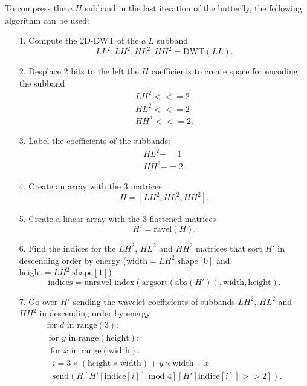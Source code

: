 To compress the $a.H$ subband in the last iteration of the butterfly,
the following algorithm can be used:
\begin{enumerate}
\item [1.] Compute the 2D-DWT of the $a.L$ subband
\begin{equation}
  LL^2, LH^2, HL^2, HH^2 = \text{DWT}(LL). 
\end{equation}

\item [2.] Desplace 2 bits to the left the $H$ coefficients to create
  space for encoding the subband
  \begin{equation}
    \begin{array}{l}
      LH^2 <<= 2 \\
      HL^2 <<= 2 \\
      HH^2 <<= 2.
    \end{array}
  \end{equation}
\item [3.] Label the coefficients of the subbands:
  \begin{equation}
    \begin{array}{l}
      HL^2 += 1 \\
      HH^2 += 2.
    \end{array}
  \end{equation}
\item [4.] Create an array with the 3 matrices
  \begin{equation}
    H = [LH^2, HL^2, HH^2].
  \end{equation}
\item [5.] Create a linear array with the 3 flattened matrices
  \begin{equation}
    H'=\text{ravel}(H).
  \end{equation}
\item [6.] Find the indices for the $LH^2$, $HL^2$ and $HH^2$ matrices
  that sort $H'$ in descending order by energy
  ($\text{width}=LH^2.\text{shape}[0]$ and $\text{height}=LH^2.\text{shape}[1]$)
  \begin{equation}
    \text{indices} =
    \text{unravel\_index}(\text{argsort}(\text{abs}(H')), \text{width},
    \text{height}).
  \end{equation}
\item [7.] Go over $H'$ sending the wavelet coefficients of subbands
  $LH^2$, $HL^2$ and $HH^2$ in descending order by energy
  \begin{equation}
    \begin{array}{l}
      \text{for~}d\text{~in range}(3): \\
      ~ \text{for~}y\text{~in range}(\text{height}): \\
      ~~ \text{for~}x\text{~in range}(\text{width}): \\
      ~~~ i = 3\times(\text{height}\times \text{width})+y\times \text{width} + x \\
      ~~~ \text{send}(H[H'[\text{indice}[i]] \text{~mod~} 4][H'[\text{indice}[i]] >> 2]).
    \end{array}
  \end{equation}
\end{enumerate}

